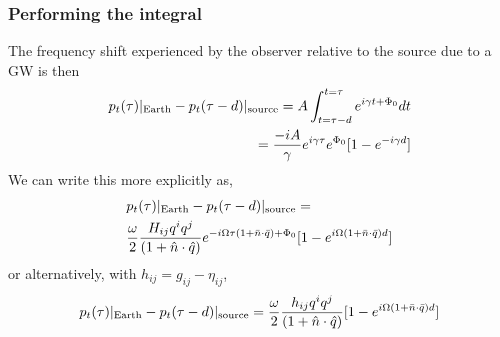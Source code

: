\documentclass[fleqn,usenatbib,useAMS]{mnras}
\begin{document}
\subsubsection{Performing the integral}

The frequency shift experienced by the observer relative to the source due to a GW is then
\begin{align}
	p_t(\tau)|_{\rm Earth} - p_t(\tau - d)|_{\rm source} = A \int_{t = \tau - d}^{t=\tau} e^{i \gamma t + \Phi_0}dt  \\
	=\frac{-iA}{\gamma} e^{i \gamma \tau}e^{\Phi_0}[1 - e^{-i \gamma d}] 
	\label{eq:concise}
\end{align}
We can write this more explicitly as,
\begin{align} \label{eq:final}
	&p_t(\tau)|_{\rm Earth} - p_t(\tau - d)|_{\rm source} = \\
	&\frac{ \omega}{2} \frac{H_{ij}q^i q^j  }{(1 + \hat{n} \cdot \hat{q})}e^{-i \Omega \tau(1+\bar{n} \cdot \bar{q}) + \Phi_0} [1 - e^{i \Omega(1+\bar{n} \cdot \bar{q}) d}]
\end{align}
or alternatively, with $h_{ij} = g_{ij} - \eta_{ij}$,
\begin{equation}
	p_t(\tau)|_{\rm Earth} - p_t(\tau - d)|_{\rm source} =\frac{ \omega}{2} \frac{h_{ij} q^i q^j  }{(1 + \hat{n} \cdot \hat{q})} [1 - e^{i \Omega(1+\bar{n} \cdot \bar{q}) d}]
	\label{eq:freq_shift}
\end{equation}
\end{document}
